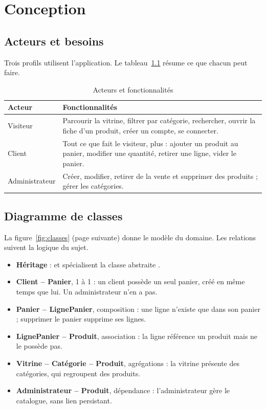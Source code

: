 \chapter{Conception}\label{chap:conception}

\section{Acteurs et besoins}
Trois profils utilisent l'application. Le tableau~\ref{tab:acteurs} résume ce que chacun peut faire.

\begin{table}[htbp]
\centering
\caption{Acteurs et fonctionnalités}\label{tab:acteurs}
\begin{tabularx}{\linewidth}{@{}lX@{}}
\toprule
\textbf{Acteur} & \textbf{Fonctionnalités}\\
\midrule
Visiteur & Parcourir la vitrine, filtrer par catégorie, rechercher, ouvrir la fiche d'un produit, créer un compte, se connecter.\\
Client & Tout ce que fait le visiteur, plus : ajouter un produit au panier, modifier une quantité, retirer une ligne, vider le panier.\\
Administrateur & Créer, modifier, retirer de la vente et supprimer des produits ; gérer les catégories.\\
\bottomrule
\end{tabularx}
\end{table}

\section{Diagramme de classes}
La figure~\ref{fig:classes} (page suivante) donne le modèle du domaine. Les relations suivent la logique du sujet.

\begin{itemize}
  \item \textbf{Héritage} :  et  spécialisent la classe abstraite .
  \item \textbf{Client -- Panier}, 1 à 1 : un client possède un seul panier, créé en même temps que lui. Un
        administrateur n'en a pas.
  \item \textbf{Panier -- LignePanier}, composition : une ligne n'existe que dans son panier ; supprimer le panier
        supprime ses lignes.
  \item \textbf{LignePanier -- Produit}, association : la ligne référence un produit mais ne le possède pas.
  \item \textbf{Vitrine -- Catégorie -- Produit}, agrégations : la vitrine présente des catégories, qui regroupent
        des produits.
  \item \textbf{Administrateur -- Produit}, dépendance : l'administrateur gère le catalogue, sans lien persistant.
\end{itemize}

